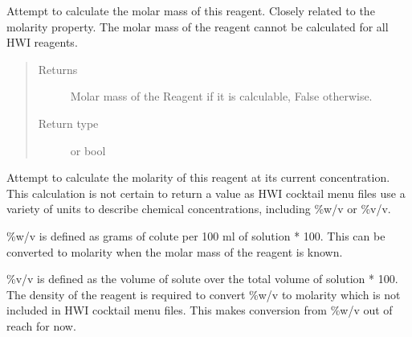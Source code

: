 \documentclass[letterpaper,10pt,english]{sphinxmanual}
\begin{document}
\begin{fulllineitems}
\begin{fulllineitems}
\begin{quote}
\begin{description}
\end{description}\end{quote}

\end{fulllineitems}


\begin{fulllineitems}
\label{\detokenize{polo.crystallography:polo.crystallography.cocktail.Reagent.molar_mass}}
Attempt to calculate the molar mass of this reagent. Closely related
to the molarity property. The molar mass of the reagent cannot be
calculated for all HWI reagents.
\begin{quote}\begin{description}
\item[{Returns}] \leavevmode
Molar mass of the Reagent if it is calculable, False otherwise.

\item[{Return type}] \leavevmode
{\hyperref[\detokenize{polo.crystallography:polo.crystallography.cocktail.UnitValue}]{}} or bool

\end{description}\end{quote}

\end{fulllineitems}


\begin{fulllineitems}
\label{\detokenize{polo.crystallography:polo.crystallography.cocktail.Reagent.molarity}}
Attempt to calculate the molarity of this reagent at its current
concentration. This calculation is not certain to return a value
as HWI cocktail menu files use a variety of units to describe
chemical concentrations, including \%w/v or \%v/v.

\%w/v is defined as grams of colute per 100 ml of solution * 100. This can
be converted to molarity when the molar mass of the reagent is known.

\%v/v is defined as the volume of solute over the total volume of solution
* 100. The density of the reagent is required to convert \%w/v to molarity
which is not included in HWI cocktail menu files. This makes conversion
from \%w/v out of reach for now.


\end{fulllineitems}
\end{fulllineitems}
\end{document}
